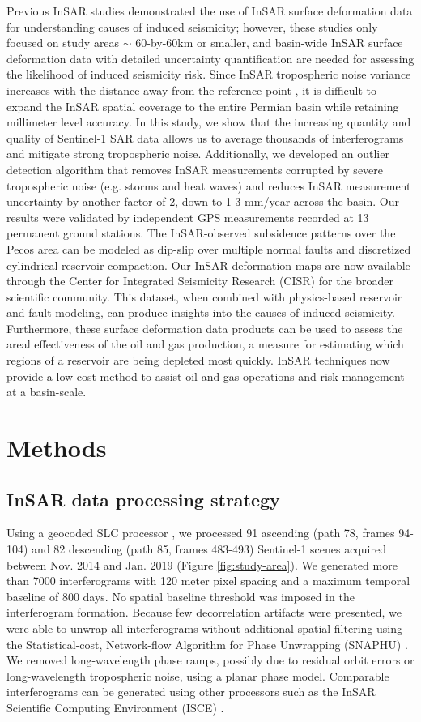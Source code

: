 \documentclass[draft]{agujournal2019}
\begin{document}
Previous InSAR studies demonstrated the use of InSAR surface deformation data for understanding causes of induced seismicity; however, these studies only focused on study areas $ \sim $ 60-by-60km or smaller, and basin-wide InSAR surface deformation data with detailed uncertainty quantification are needed for assessing the likelihood of induced seismicity risk. Since InSAR tropospheric noise variance increases with the distance away from the reference point \cite{Emardson2003}, it is difficult to expand the InSAR spatial coverage to the entire Permian basin while retaining millimeter level accuracy. In this study, we show that the increasing quantity and quality of Sentinel-1 SAR data allows us to average thousands of interferograms and mitigate strong tropospheric noise. Additionally, we developed an outlier detection algorithm that removes InSAR measurements corrupted by severe tropospheric noise (e.g. storms and heat waves) and reduces InSAR measurement uncertainty by another factor of 2, down to 1-3 mm/year across the basin. Our results were validated by independent GPS measurements recorded at 13 permanent ground stations. The InSAR-observed subsidence patterns over the Pecos area can be modeled as dip-slip over multiple normal faults and discretized cylindrical reservoir compaction. Our InSAR deformation maps are now available through the Center for Integrated Seismicity Research (CISR) for the broader scientific community. This dataset, when combined with physics-based reservoir and fault modeling, can produce insights into the causes of induced seismicity. Furthermore, these surface deformation data products can be used to assess the areal effectiveness of the oil and gas production, a measure for estimating which regions of a reservoir are being depleted most quickly. InSAR techniques now provide a low-cost method to assist oil and gas operations and risk management at a basin-scale.

\section{Methods}
\subsection{InSAR data processing strategy}
\label{sec:InSARprocessing}
Using a geocoded SLC processor \cite{zheng2017phase, zebker2017user}, we processed 91 ascending (path 78, frames 94-104) and 82 descending (path 85, frames 483-493) Sentinel-1 scenes acquired between Nov. 2014 and Jan. 2019 (Figure \ref{fig:study-area}). We generated more than 7000 interferograms with 120 meter pixel spacing and a maximum temporal baseline of 800 days. No spatial baseline threshold was imposed in the interferogram formation. Because few decorrelation artifacts were presented, we were able to unwrap all interferograms without additional spatial filtering using the Statistical-cost, Network-flow Algorithm for Phase Unwrapping (SNAPHU) \cite{Chen2001}. We removed long-wavelength phase ramps, possibly due to residual orbit errors or long-wavelength tropospheric noise, using a planar phase model. Comparable interferograms can be generated using other processors such as the InSAR Scientific Computing Environment (ISCE) \cite{rosen2012insar}. 
\end{document}
